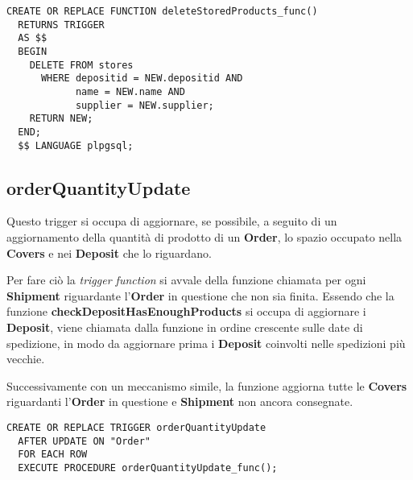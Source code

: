\begin{lstlisting}[caption={Funzione \textbf{deleteStoredProducts}}]
  CREATE OR REPLACE FUNCTION deleteStoredProducts_func()
  RETURNS TRIGGER
  AS $$
  BEGIN
    DELETE FROM stores
      WHERE depositid = NEW.depositid AND
            name = NEW.name AND
            supplier = NEW.supplier;
    RETURN NEW;
  END;
  $$ LANGUAGE plpgsql;
\end{lstlisting}

\subsection{\textbf{orderQuantityUpdate}}

Questo trigger si occupa di aggiornare, se possibile, a seguito di un aggiornamento della quantità di prodotto di un \textbf{Order}, lo spazio occupato nella \textbf{Covers} e nei \textbf{Deposit} che lo riguardano.

Per fare ciò la \textit{trigger function} si avvale della funzione  chiamata per ogni \textbf{Shipment} riguardante l'\textbf{Order} in questione che non sia finita. Essendo che la funzione \textbf{checkDepositHasEnoughProducts} si occupa di aggiornare i \textbf{Deposit}, viene chiamata dalla funzione in ordine crescente sulle date di spedizione, in modo da aggiornare prima i \textbf{Deposit} coinvolti nelle spedizioni più vecchie.

Successivamente con un meccanismo simile, la funzione aggiorna tutte le \textbf{Covers} riguardanti l'\textbf{Order} in questione e \textbf{Shipment} non ancora consegnate.

\begin{lstlisting}[caption={Trigger per implementare \textbf{orderQuantityUpdate}}]
  CREATE OR REPLACE TRIGGER orderQuantityUpdate
  AFTER UPDATE ON "Order"
  FOR EACH ROW
  EXECUTE PROCEDURE orderQuantityUpdate_func();
\end{lstlisting}

